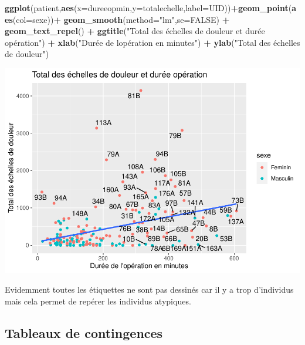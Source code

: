 \documentclass[
]{book}
\newenvironment{Shaded}{\begin{snugshade}}{\end{snugshade}}
\newcommand{\AttributeTok}[1]{\textcolor[rgb]{0.13,0.29,0.53}{#1}}
\newcommand{\ConstantTok}[1]{\textcolor[rgb]{0.56,0.35,0.01}{#1}}
\newcommand{\FunctionTok}[1]{\textcolor[rgb]{0.13,0.29,0.53}{\textbf{#1}}}
\newcommand{\NormalTok}[1]{#1}
\newcommand{\SpecialCharTok}[1]{\textcolor[rgb]{0.81,0.36,0.00}{\textbf{#1}}}
\newcommand{\StringTok}[1]{\textcolor[rgb]{0.31,0.60,0.02}{#1}}
\begin{document}
\begin{Shaded}
\begin{Highlighting}[]
\FunctionTok{ggplot}\NormalTok{(patient,}\FunctionTok{aes}\NormalTok{(}\AttributeTok{x=}\NormalTok{dureeopmin,}\AttributeTok{y=}\NormalTok{totalechelle,}\AttributeTok{label=}\NormalTok{UID))}\SpecialCharTok{+}\FunctionTok{geom\_point}\NormalTok{(}\FunctionTok{aes}\NormalTok{(}\AttributeTok{col=}\NormalTok{sexe))}\SpecialCharTok{+}
  \FunctionTok{geom\_smooth}\NormalTok{(}\AttributeTok{method=}\StringTok{"lm"}\NormalTok{,}\AttributeTok{se=}\ConstantTok{FALSE}\NormalTok{) }\SpecialCharTok{+}
  \FunctionTok{geom\_text\_repel}\NormalTok{() }\SpecialCharTok{+}
  \FunctionTok{ggtitle}\NormalTok{(}\StringTok{"Total des échelles de douleur et durée opération"}\NormalTok{) }\SpecialCharTok{+} 
  \FunctionTok{xlab}\NormalTok{(}\StringTok{"Durée de l\textquotesingle{}opération en minutes"}\NormalTok{) }\SpecialCharTok{+} 
  \FunctionTok{ylab}\NormalTok{(}\StringTok{"Total des échelles de douleur"}\NormalTok{) }
\end{Highlighting}
\end{Shaded}

\includegraphics{_main_files/figure-latex/ggplot21-1.pdf}

Evidemment toutes les étiquettes ne sont pas dessinés car il y a trop d'individus
mais cela permet de repérer les individus atypiques.

\hypertarget{tableaux-de-contingences}{%
\subsection{Tableaux de contingences}\label{tableaux-de-contingences}}
\end{document}
